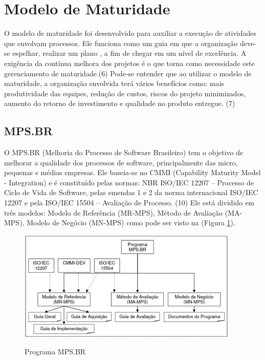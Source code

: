 \section {Modelo de Maturidade}

O modelo de maturidade foi desenvolvido para auxiliar a execução de atividades que envolvam processos. Ele funciona como um guia em que a organização deve-se  espelhar, realizar um plano , a fim de chegar em um nível de excelência. A exigência da contínua melhora dos projetos é o que torna como necessidade este gerenciamento de maturidade.(6)
Pode-se entender que ao utilizar o modelo de maturidade, a organização envolvida terá vários benefícios como: mais produtividade das equipes, redução de custos, riscos do projeto minimizados, aumento do retorno de investimento e qualidade no produto entregue. (7)

\subsection {MPS.BR}

O MPS.BR (Melhoria do Processo de Software Brasileiro) tem o objetivo de melhorar a qualidade dos processos de software, principalmente das micro, pequenas e médias empresas. Ele baseia-se no CMMI (Capability Maturity Model - Integration) e é constituído pelas normas: NBR ISO/IEC 12207 – Processo de Ciclo de Vida de Software, pelas emendas 1 e 2 da norma internacional ISO/IEC 12207 e pela ISO/IEC 15504 – Avaliação de Processo. (10)
Ele está dividido em três modelos: Modelo de Referência (MR-MPS), Método de Avaliação (MA-MPS), Modelo de Negócio (MN-MPS) como pode ser visto na (Figura \ref{img:mps2}).

\FloatBarrier
\begin{figure}[!htpd]
		\centering
		\caption{Programa MPS.BR}
		\includegraphics[scale=1.0]{figuras/mps2}
		\label{img:mps2}
\end{figure}
\FloatBarrier

